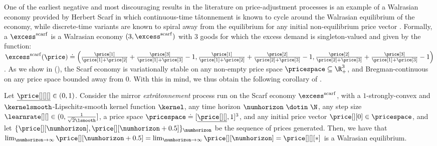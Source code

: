 One of the earliest negative and most discouraging results in the literature on price-adjustment processes is an example of a Walrasian economy provided by Herbert Scarf in which continuous-time t\^atonnement is known to cycle around the Walrasian equilibrium of the economy, while discrete-time variants are known to spiral away from the equilibrium for any initial non-equilibrium price vector \cite{scarf1960instable}. Formally, a  $\excess^{\mathrm{scarf}}$ is a Walrasian economy $(3, \excess^{\mathrm{scarf}})$ with 3 goods for which the excess demand is singleton-valued and given by the function:
$
        \excess^{\mathrm{scarf}}(\price) \doteq \left(
            \frac{\price[1]}{\price[1] + \price[2]} + \frac{\price[3]}{\price[1] + \price[3]} - 1,
            \frac{\price[1]}{\price[1] + \price[2]} + \frac{\price[2]}{\price[2] + \price[3]} - 1,
            \frac{\price[2]}{\price[2] + \price[3]} + \frac{\price[3]}{\price[1] + \price[3]} - 1
            \right)
$.
As we show in  (), the Scarf economy is variationally stable on any non-empty price space $\pricespace \subseteq \R^3_+$, and Bregman-continuous on any price space bounded away from $0$. With this in mind, we thus obtain the following corollary of .
% 
\begin{corollary}\label{thm:scarf_convergence}
    Let $\underline{\price[ ][][]} \in (0, 1)$.
    Consider the mirror \emph{extr\^atonnement} process run on the Scarf economy $\excess^{\mathrm{scarf}}$, with a $1$-strongly-convex and $\kernelsmooth$-Lipschitz-smooth kernel function $\kernel$, any time horizon $\numhorizon \ \dotin \  \N$, any step size $\learnrate[ ][ ] \in (0, \frac{1}{\sqrt{2}\lsmooth}]$, a price space $\pricespace \doteq [\underline{\price[ ][]}, 1]^3$, and any initial price vector $\price[][0] \in \pricespace$, and let $\{\price[][\numhorizon], \price[][\numhorizon + 0.5] \}_{\numhorizon}$ be the sequence of prices generated. Then, we have that $\lim_{\numhorizon \to \infty} \price[][\numhorizon+0.5] = \lim_{\numhorizon \to \infty} \price[][\numhorizon] = \price[][][*]$ is a Walrasian equilibrium.
\end{corollary}


